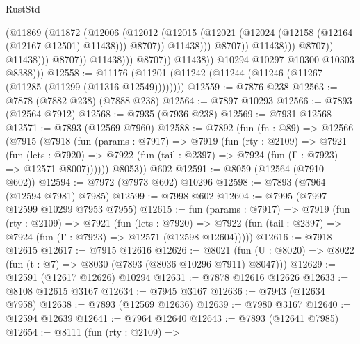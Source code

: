 \begin{lexlean}{RustStd}
\begin{coremodule}
{\begin{coremodule}
{{{{{{{{{{{{{{{{{{{{{{{{{{{{{{{{{{{{{{{{{{{{{{{{{{                                              (@11869
                                                (@11872
                                                  (@12006
                                                    (@12012
                                                      (@12015
                                                        (@12021
                                                          (@12024
                                                            (@12158
                                                              (@12164 (@12167 @12501) @11438)))
                                                          @8707))
                                                      @11438)))
                                                @8707))
                                            @11438)))
                                      @8707))
                                  @11438)))
                            @8707))
                        @11438)))
                  @8707))
              @11438))
          @10294
          @10297
          @10300
          @10303
          @8388)))
@12558 := @11176 (@11201 (@11242 (@11244 (@11246 (@11267 (@11285 (@11299 (@11316 @12549))))))))
@12559 := @7876 @238
@12563 := @7878 (@7882 @238) (@7888 @238)
@12564 := @7897 @10293
@12566 := @7893 (@12564 @7912)
@12568 := @7935 (@7936 @238)
@12569 := @7931 @12568
@12571 := @7893 (@12569 @7960)
@12588 := @7892
    (fun (fn : @89) =>
    @12566
      (@7915
        (@7918
          (fun (params : @7917) =>
          @7919
            (fun (rty : @2109) =>
            @7921
              (fun (lets : @7920) =>
              @7922 (fun (tail : @2397) => @7924 (fun (Γ : @7923) => @12571 @8007))))))
        @8053))
    @602
@12591 := @8059 (@12564 (@7910 @602))
@12594 := @7972 (@7973 @602) @10296
@12598 := @7893 (@7964 (@12594 @7981) @7985)
@12599 := @7998 @602
@12604 := @7995 (@7997 @12599 @10299 @7953 @7955)
@12615 := fun (params : @7917) =>
  @7919
    (fun (rty : @2109) =>
    @7921
      (fun (lets : @7920) =>
      @7922 (fun (tail : @2397) => @7924 (fun (Γ : @7923) => @12571 (@12598 @12604)))))
@12616 := @7918 @12615
@12617 := @7915 @12616
@12626 := @8021
    (fun (U : @8020) => @8022 (fun (t : @7) => @8030 (@7893 (@8036 @10296 @7911) @8047)))
@12629 := @12591 (@12617 @12626) @10294
@12631 := @7878 @12616 @12626
@12633 := @8108 @12615 @3167
@12634 := @7945 @3167
@12636 := @7943 (@12634 @7958)
@12638 := @7893 (@12569 @12636)
@12639 := @7980 @3167
@12640 := @12594 @12639
@12641 := @7964 @12640
@12643 := @7893 (@12641 @7985)
@12654 := @8111
    (fun (rty : @2109) =>
}}}}}}}}}}}}}}}}}}}}}}}}}}}}}}}}}}}}}}}}}}}}}}}}}}
\end{coremodule}}
\end{coremodule}
\end{lexlean}
